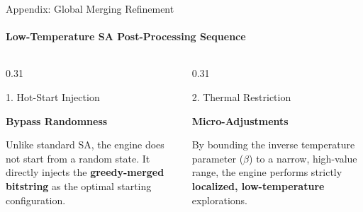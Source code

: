 \documentclass[10pt, aspectratio=169]{beamer}
\begin{document}
\begin{frame}{Appendix: Global Merging Refinement}
    \framesubtitle{Low-Temperature SA Post-Processing Sequence}
    

    \begin{columns}[T]
        
        \begin{column}{0.31\textwidth}
            \begin{block}{1. Hot-Start Injection}
                \begin{minipage}[t][4.5cm][t]{\linewidth}
                    \centering
                    \vspace{0.3cm}
                    {\large \textbf{Bypass Randomness}}\\[0.3cm]
                    \raggedright
                    \small Unlike standard SA, the engine does not start from a random state. It directly injects the \textbf{greedy-merged bitstring} as the optimal starting configuration.
                \end{minipage}
            \end{block}
        \end{column}
        
        
        \begin{column}{0.31\textwidth}
            \begin{block}{2. Thermal Restriction}
                \begin{minipage}[t][4.5cm][t]{\linewidth}
                    \centering
                    \vspace{0.3cm}
                    {\large \textbf{Micro-Adjustments}}\\[0.3cm]
                    \raggedright
                    \small By bounding the inverse temperature parameter ($\beta$) to a narrow, high-value range, the engine performs strictly \textbf{localized, low-temperature} explorations.
                \end{minipage}
            \end{block}
        \end{column}
        
        

\end{columns}
\end{frame}
\end{document}
